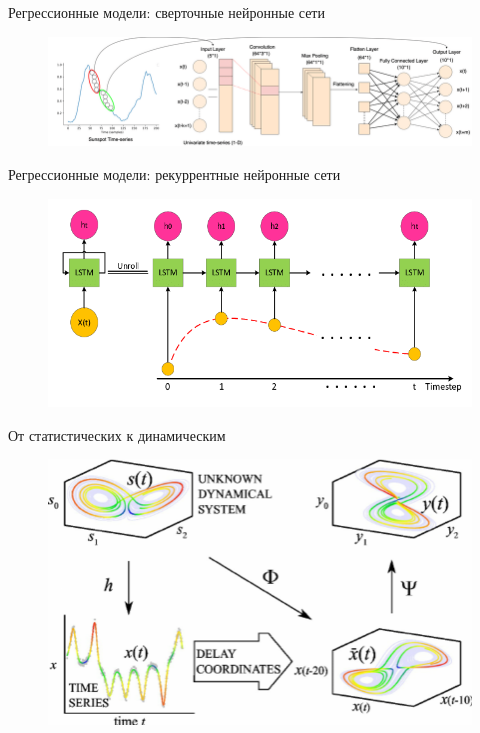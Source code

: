 \begin{frame}{Регрессионные модели: сверточные нейронные сети}
	\begin{figure}
		\centering
		\includegraphics[width=\linewidth]{lecture_1/figs/One-dimensional-Convolutional-Neural-Network-for-time-series.png}
	\end{figure}
\end{frame}
\begin{frame}{Регрессионные модели: рекуррентные нейронные сети}
	\begin{figure}
		\centering
		\includegraphics[width=\linewidth]{lecture_1/figs/lstm.png}
	\end{figure}
\end{frame}
\begin{frame}{От статистических к динамическим}
	\begin{figure}
		\centering
		\includegraphics[width=0.8\linewidth]{lecture_1/figs/takens.png}
	\end{figure}
\end{frame}
